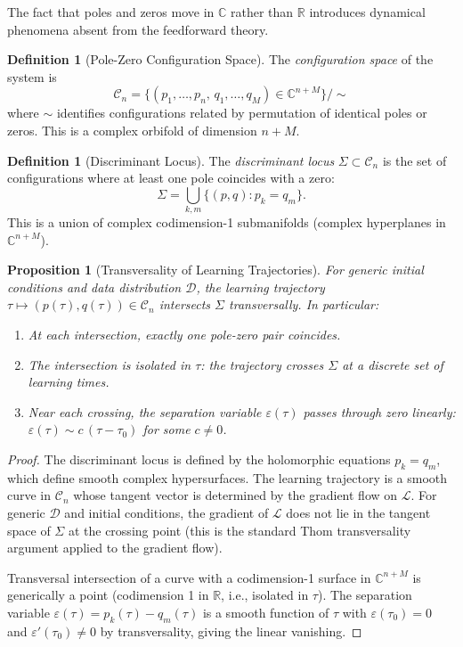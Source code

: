 \documentclass[11pt,a4paper]{article}
\newtheorem{proposition}[theorem]{Proposition}
\theoremstyle{definition}
\newtheorem{definition}[theorem]{Definition}
\newcommand{\C}{\mathbb{C}}
\newcommand{\R}{\mathbb{R}}
\newcommand{\cL}{\mathcal{L}}
\newcommand{\cD}{\mathcal{D}}
\newcommand{\eps}{\varepsilon}
\begin{document}
The fact that poles and zeros move in $\C$ rather than $\R$
introduces dynamical phenomena absent from the feedforward theory.

\begin{definition}[Pole-Zero Configuration Space]\label{def:config}
The \emph{configuration space} of the system is
\begin{equation}
  \mathcal{C}_n
  = \bigl\{(p_1,\ldots,p_n,\, q_1,\ldots,q_M) \in
  \C^{n+M}\bigr\} / \!\sim
\end{equation}
where $\sim$ identifies configurations related by permutation
of identical poles or zeros. This is a complex orbifold of
dimension $n + M$.
\end{definition}

\begin{definition}[Discriminant Locus]\label{def:discriminant}
The \emph{discriminant locus} $\Sigma \subset \mathcal{C}_n$ is
the set of configurations where at least one pole coincides
with a zero:
\begin{equation}
  \Sigma = \bigcup_{k,m} \{(p,q) : p_k = q_m\}.
\end{equation}
This is a union of complex codimension-1 submanifolds
(complex hyperplanes in $\C^{n+M}$).
\end{definition}

\begin{proposition}[Transversality of Learning Trajectories]%
\label{prop:transversal}
For generic initial conditions and data distribution $\cD$,
the learning trajectory
$\tau \mapsto (p(\tau), q(\tau)) \in \mathcal{C}_n$
intersects $\Sigma$ transversally. In particular:
\begin{enumerate}[label=(\roman*)]
  \item At each intersection, exactly one pole-zero pair
    coincides.
  \item The intersection is isolated in $\tau$: the trajectory
    crosses $\Sigma$ at a discrete set of learning times.
  \item Near each crossing, the separation variable $\eps(\tau)$
    passes through zero linearly:
    $\eps(\tau) \sim c\,(\tau-\tau_0)$ for some $c \neq 0$.
\end{enumerate}
\end{proposition}

\begin{proof}
The discriminant locus is defined by the holomorphic equations
$p_k = q_m$, which define smooth complex hypersurfaces.
The learning trajectory is a smooth curve in $\mathcal{C}_n$
whose tangent vector is determined by the gradient flow on
$\cL$. For generic $\cD$ and initial conditions, the gradient
of $\cL$ does not lie in the tangent space of $\Sigma$ at the
crossing point (this is the standard Thom transversality
argument applied to the gradient flow).

Transversal intersection of a curve with a codimension-1 surface
in $\C^{n+M}$ is generically a point (codimension 1 in $\R$,
i.e., isolated in $\tau$). The separation variable
$\eps(\tau) = p_k(\tau) - q_m(\tau)$ is a smooth function of
$\tau$ with $\eps(\tau_0) = 0$ and $\eps'(\tau_0) \neq 0$ by
transversality, giving the linear vanishing.
\end{proof}
\end{document}
